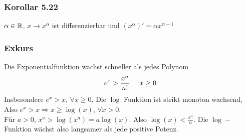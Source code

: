 \subsubsection*{Korollar 5.22}
$\alpha\in\mathbb{R}$, $x\to x^\alpha$ ist differenzierbar und $\left( x^\alpha\right)'=\alpha x^{\alpha-1}$

\subsubsection*{Exkurs}
Die Exponentialfunktion wächst schneller als jedes Polynom
\[{e^x} > \frac{{{x^n}}}{{n!}}\hspace{5mm}x \ge 0\]
Insbesondere $e^x>x$, $\forall x\geq 0$. Die $\log$ Funktion ist strikt monoton wachsend, Also $e^x>x\Rightarrow x\geq \log(x)$, $\forall x>0$.\\

Für $a>0$, $x^a>\log (x^a)=a\log(x)$. Also $\log(x)<\frac{x^a}{a}$. Die $\log-$Funktion wächst also langsamer als jede positive Potenz.

